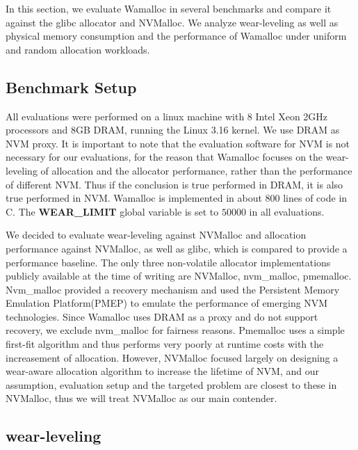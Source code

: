 \documentclass{vldb}
\begin{document}
In this section, we evaluate Wamalloc in several benchmarks and compare it against the glibc allocator and NVMalloc\cite{moraru2013consistent}.
We analyze wear-leveling as well as physical memory consumption and the performance of Wamalloc under uniform and random allocation workloads.

\subsection{Benchmark Setup}

All evaluations were performed on a linux machine with 8 Intel Xeon 2GHz processors and 8GB DRAM, running the Linux 3.16 kernel.
We use DRAM as NVM proxy. It is important to note that the evaluation software for NVM is not necessary for our evaluations, for the reason that Wamalloc focuses on the wear-leveling of allocation and the allocator performance, rather than the performance of different NVM.
Thus if the conclusion is true performed in DRAM, it is also true performed in NVM.
Wamalloc is implemented in about 800 lines of code in C.
The \textbf{WEAR\_LIMIT} global variable is set to $50000$ in all evaluations.

We decided to evaluate wear-leveling against NVMalloc and allocation performance against NVMalloc, as well as glibc,
which is compared to provide a performance baseline. 
The only three non-volatile allocator implementations publicly available at the time of writing are NVMalloc, nvm\_malloc\cite{schwalbnvm}, pmemalloc.
Nvm\_malloc provided a recovery mechanism and used the Persistent Memory Emulation Platform(PMEP)\cite{dulloor2014system} to emulate the performance of emerging NVM technologies.
Since Wamalloc uses DRAM as a proxy and do not support recovery, we exclude nvm\_malloc for fairness reasons.
Pmemalloc uses a simple first-fit algorithm and thus performs very poorly at runtime costs with the increasement of allocation.
However, NVMalloc focused largely on designing a wear-aware allocation algorithm to increase the lifetime of NVM, 
and our assumption, evaluation setup and the targeted problem are closest to these in NVMalloc, 
thus we will treat NVMalloc as our main contender.

\subsection{wear-leveling}
\end{document}
